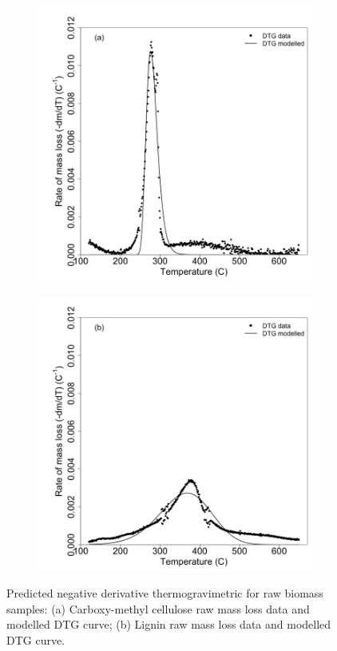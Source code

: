 \documentclass{article}
\begin{document}
\begin{figure}
\centering
	\begin{subfigure}[b]{0.48\textwidth}
		\includegraphics[width=\textwidth]{figs/raw_CL.png}
	\end{subfigure}
	\hfill
	\begin{subfigure}[b]{0.48\textwidth}
		\includegraphics[width=\textwidth]{figs/raw_LG.png}
	\end{subfigure}
	\caption{Predicted negative derivative thermogravimetric for raw biomass samples: (a) Carboxy-methyl cellulose raw mass loss data and modelled DTG curve; (b) Lignin raw mass loss data and modelled DTG curve.}
\end{figure}
\end{document}
